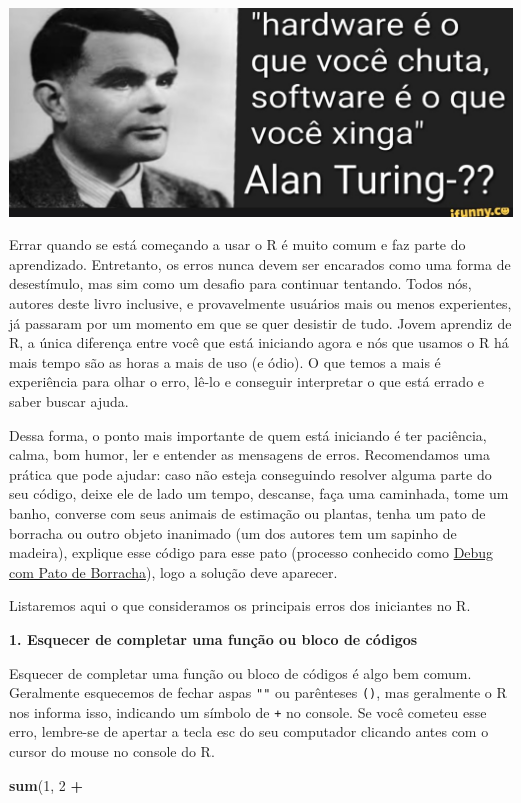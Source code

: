 \documentclass[
]{article}
\newenvironment{Shaded}{\begin{snugshade}}{\end{snugshade}}
\newcommand{\DecValTok}[1]{\textcolor[rgb]{0.00,0.00,0.81}{#1}}
\newcommand{\FunctionTok}[1]{\textcolor[rgb]{0.13,0.29,0.53}{\textbf{#1}}}
\newcommand{\NormalTok}[1]{#1}
\newcommand{\SpecialCharTok}[1]{\textcolor[rgb]{0.81,0.36,0.00}{\textbf{#1}}}
\begin{document}
\begin{center}\includegraphics[width=0.55\linewidth,height=0.55\textheight]{figures/Turing_quote_01} \end{center}

Errar quando se está começando a usar o R é muito comum e faz parte do aprendizado. Entretanto, os erros nunca devem ser encarados como uma forma de desestímulo, mas sim como um desafio para continuar tentando. Todos nós, autores deste livro inclusive, e provavelmente usuários mais ou menos experientes, já passaram por um momento em que se quer desistir de tudo. Jovem aprendiz de R, a única diferença entre você que está iniciando agora e nós que usamos o R há mais tempo são as horas a mais de uso (e ódio). O que temos a mais é experiência para olhar o erro, lê-lo e conseguir interpretar o que está errado e saber buscar ajuda.

Dessa forma, o ponto mais importante de quem está iniciando é ter paciência, calma, bom humor, ler e entender as mensagens de erros. Recomendamos uma prática que pode ajudar: caso não esteja conseguindo resolver alguma parte do seu código, deixe ele de lado um tempo, descanse, faça uma caminhada, tome um banho, converse com seus animais de estimação ou plantas, tenha um pato de borracha ou outro objeto inanimado (um dos autores tem um sapinho de madeira), explique esse código para esse pato (processo conhecido como \href{https://pt.wikipedia.org/wiki/Debug_com_Pato_de_Borracha}{Debug com Pato de Borracha}), logo a solução deve aparecer.

Listaremos aqui o que consideramos os principais erros dos iniciantes no R.

\textbf{1. Esquecer de completar uma função ou bloco de códigos}

Esquecer de completar uma função ou bloco de códigos é algo bem comum. Geralmente esquecemos de fechar aspas \texttt{""} ou parênteses \texttt{()}, mas geralmente o R nos informa isso, indicando um símbolo de \texttt{+} no console. Se você cometeu esse erro, lembre-se de apertar a tecla esc do seu computador clicando antes com o cursor do mouse no console do R.

\begin{Shaded}
\begin{Highlighting}[]
\FunctionTok{sum}\NormalTok{(}\DecValTok{1}\NormalTok{, }\DecValTok{2}
  \SpecialCharTok{+}
\end{Highlighting}
\end{Shaded}
\end{document}
